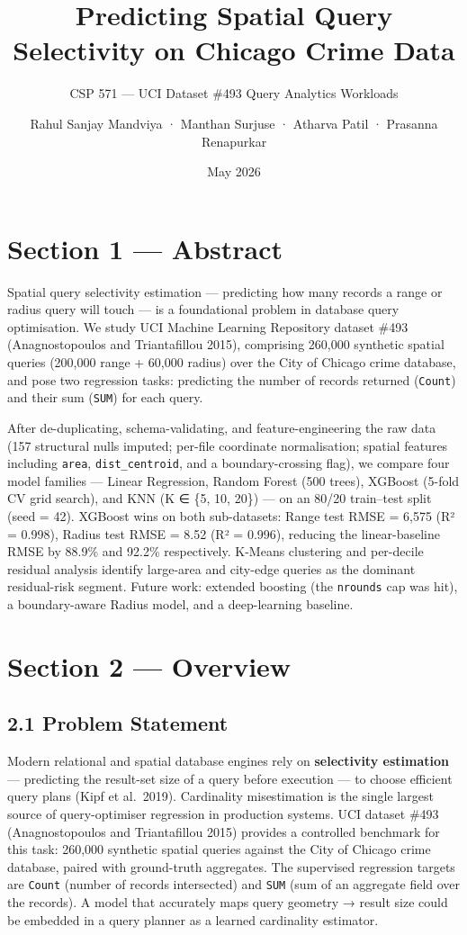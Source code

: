 \documentclass[
  10pt,
  twocolumn,
  10pt]{article}
\title{Predicting Spatial Query Selectivity on Chicago Crime Data}
\subtitle{CSP 571 --- UCI Dataset \#493 Query Analytics Workloads}
\author{Rahul Sanjay Mandviya · Manthan Surjuse · Atharva Patil ·
Prasanna Renapurkar}
\date{May 2026}
\begin{document}
\maketitle

\section{Section 1 --- Abstract}\label{section-1-abstract}

Spatial query selectivity estimation --- predicting how many records a
range or radius query will touch --- is a foundational problem in
database query optimisation. We study UCI Machine Learning Repository
dataset \#493 (Anagnostopoulos and Triantafillou 2015), comprising
260,000 synthetic spatial queries (200,000 range + 60,000 radius) over
the City of Chicago crime database, and pose two regression tasks:
predicting the number of records returned (\texttt{Count}) and their sum
(\texttt{SUM}) for each query.

After de-duplicating, schema-validating, and feature-engineering the raw
data (157 structural nulls imputed; per-file coordinate normalisation;
spatial features including \texttt{area}, \texttt{dist\_centroid}, and a
boundary-crossing flag), we compare four model families --- Linear
Regression, Random Forest (500 trees), XGBoost (5-fold CV grid search),
and KNN (K ∈ \{5, 10, 20\}) --- on an 80/20 train--test split (seed =
42). XGBoost wins on both sub-datasets: Range test RMSE = 6,575 (R² =
0.998), Radius test RMSE = 8.52 (R² = 0.996), reducing the
linear-baseline RMSE by 88.9\% and 92.2\% respectively. K-Means
clustering and per-decile residual analysis identify large-area and
city-edge queries as the dominant residual-risk segment. Future work:
extended boosting (the \texttt{nrounds} cap was hit), a boundary-aware
Radius model, and a deep-learning baseline.

\section{Section 2 --- Overview}\label{section-2-overview}

\subsection{2.1 Problem Statement}\label{problem-statement}

Modern relational and spatial database engines rely on
\textbf{selectivity estimation} --- predicting the result-set size of a
query before execution --- to choose efficient query plans (Kipf et
al.~2019). Cardinality misestimation is the single largest source of
query-optimiser regression in production systems. UCI dataset \#493
(Anagnostopoulos and Triantafillou 2015) provides a controlled benchmark
for this task: 260,000 synthetic spatial queries against the City of
Chicago crime database, paired with ground-truth aggregates. The
supervised regression targets are \texttt{Count} (number of records
intersected) and \texttt{SUM} (sum of an aggregate field over the
records). A model that accurately maps query geometry → result size
could be embedded in a query planner as a learned cardinality estimator.
\end{document}
